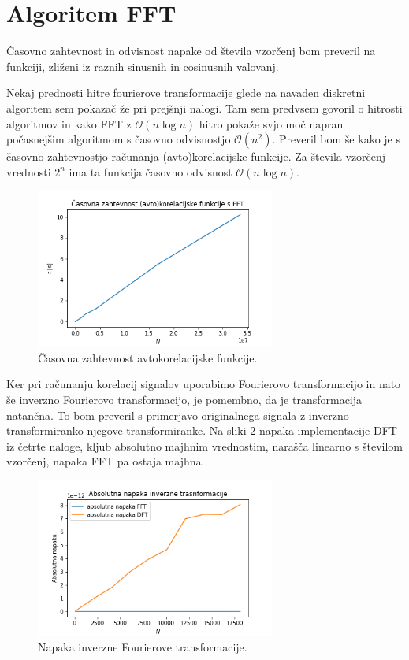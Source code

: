 \documentclass[a4paper, 12pt, slovene]{article}
\begin{document}
\section{Algoritem FFT}
Časovno zahtevnost in odvisnost napake od števila vzorčenj bom preveril na funkciji, zliženi iz raznih sinusnih in cosinusnih valovanj. \par\vspace{5mm}

Nekaj prednosti hitre fourierove transformacije glede na navaden diskretni algoritem sem pokazač že pri prejšnji nalogi. Tam sem predvsem govoril o hitrosti algoritmov in kako FFT z $\mathcal{O}(n\log n)$ hitro pokaže svjo moč napran počasnejšim algoritmom s časovno odvisnostjo $\mathcal{O}(n^2)$. Preveril bom še kako je s časovno zahtevnostjo računanja (avto)korelacijske funkcije. Za števila vzorčenj vrednosti $2^n$ ima ta funkcija časovno odvisnost $\mathcal{O}(n\log n)$. \par\vspace{5mm}

\begin{figure}[H]
\centering
\includegraphics[width=0.7\textwidth]{grafi/kor-cas.png}
\caption{Časovna zahtevnost avtokorelacijske funkcije.}
\label{f:time}
\end{figure}

Ker pri računanju korelacij signalov uporabimo Fourierovo transformacijo in nato še inverzno Fourierovo transformacijo, je pomembno, da je transformacija natančna. To bom preveril s primerjavo originalnega signala z inverzno transformiranko njegove transformiranke. Na sliki \ref{f:napaka} napaka implementacije DFT iz četrte naloge, kljub absolutno majhnim vrednostim, narašča linearno s številom vzorčenj, napaka FFT pa ostaja majhna. 

\begin{figure}[H]
\centering
\includegraphics[width=0.7\textwidth]{grafi/napake.png}
\caption{Napaka inverzne Fourierove transformacije.}
\label{f:napaka}
\end{figure}
\end{document}
